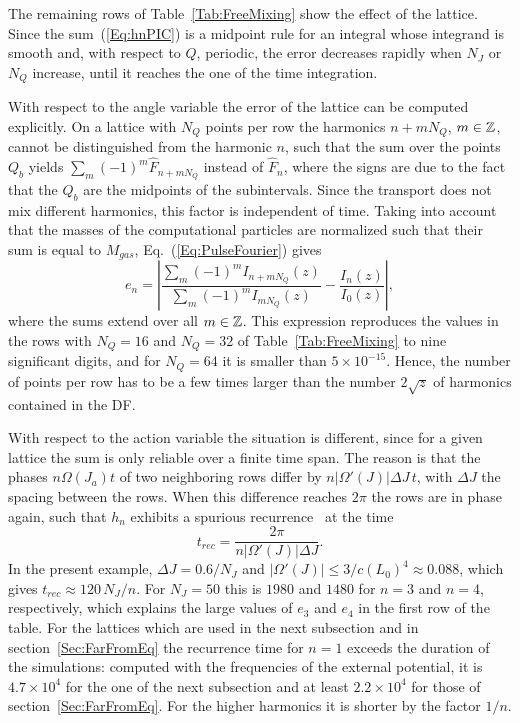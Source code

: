 The remaining rows of Table~\ref{Tab:FreeMixing} show the effect of the lattice. Since the sum~(\ref{Eq:hnPIC}) is a midpoint rule for an integral whose integrand is smooth and, with respect to $Q$, periodic, the error decreases rapidly when $N_J$ or $N_Q$ increase, until it reaches the one of the time integration.

With respect to the angle variable the error of the lattice can be computed explicitly. On a lattice with $N_Q$ points per row the harmonics $n + mN_Q$, $m\in\mathbb{Z}$, cannot be distinguished from the harmonic $n$, such that the sum over the points $Q_b$ yields $\sum_m (-1)^m\hat{F}_{n+mN_Q}$ instead of $\hat{F}_n$, where the signs are due to the fact that the $Q_b$ are the midpoints of the subintervals. Since the transport does not mix different harmonics, this factor is independent of time. Taking into account that the masses of the computational particles are normalized such that their sum is equal to $M_{gas}$, Eq.~(\ref{Eq:PulseFourier}) gives
\begin{equation}
e_n = \left| \frac{\sum_m (-1)^m I_{n+mN_Q}(z)}{\sum_m (-1)^m I_{mN_Q}(z)} - \frac{I_n(z)}{I_0(z)} \right| ,
\label{Eq:Aliasing}
\end{equation}
where the sums extend over all $m\in\mathbb{Z}$. This expression reproduces the values in the rows with $N_Q = 16$ and $N_Q = 32$ of Table~\ref{Tab:FreeMixing} to nine significant digits, and for $N_Q = 64$ it is smaller than $5\times 10^{-15}$. Hence, the number of points per row has to be a few times larger than the number $2\sqrt{z}$ of harmonics contained in the DF.

With respect to the action variable the situation is different, since for a given lattice the sum is only reliable over a finite time span. The reason is that the phases $n\Omega(J_a)t$ of two neighboring rows differ by $n|\Omega'(J)|\Delta J\, t$, with $\Delta J$ the spacing between the rows. When this difference reaches $2\pi$ the rows are in phase again, such that $h_n$ exhibits a spurious recurrence~\cite{BirdsallLangdon-Book} at the time
\begin{equation}
t_{rec} = \frac{2\pi}{n|\Omega'(J)|\Delta J}.
\label{Eq:Recurrence}
\end{equation}
In the present example, $\Delta J = 0.6/N_J$ and $|\Omega'(J)|\leq 3/c(L_0)^4\approx 0.088$, which gives $t_{rec}\approx 120\, N_J/n$. For $N_J = 50$ this is $1980$ and $1480$ for $n = 3$ and $n = 4$, respectively, which explains the large values of $e_3$ and $e_4$ in the first row of the table. For the lattices which are used in the next subsection and in section~\ref{Sec:FarFromEq} the recurrence time for $n = 1$ exceeds the duration of the simulations: computed with the frequencies of the external potential, it is $4.7\times 10^4$ for the one of the next subsection and at least $2.2\times 10^4$ for those of section~\ref{Sec:FarFromEq}. For the higher harmonics it is shorter by the factor $1/n$.

